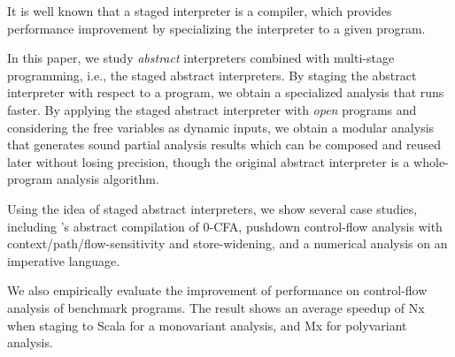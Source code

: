 It is well known that a staged interpreter is a compiler, which provides performance improvement
by specializing the interpreter to a given program.

In this paper, we study \textit{abstract} interpreters combined with multi-stage programming, i.e., the 
staged abstract interpreters. 
By staging the abstract interpreter with respect to a program, we obtain a specialized analysis that runs faster.
By applying the staged abstract interpreter with \textit{open} programs and considering the free variables as dynamic inputs, 
we obtain a modular analysis that generates sound partial analysis results which can be composed 
and reused later without losing precision, though the original abstract interpreter is a whole-program 
analysis algorithm.

Using the idea of staged abstract interpreters, we show several case studies, including 
\citeauthor{Boucher:1996:ACN:647473.727587}'s abstract compilation of  0-CFA, pushdown
control-flow analysis with context/path/flow-sensitivity and store-widening, and a numerical
analysis on an imperative language.

We also empirically evaluate the improvement of performance on control-flow analysis of benchmark programs.
The result shows an average speedup of Nx when staging to Scala for a monovariant analysis, and Mx for polyvariant analysis.

